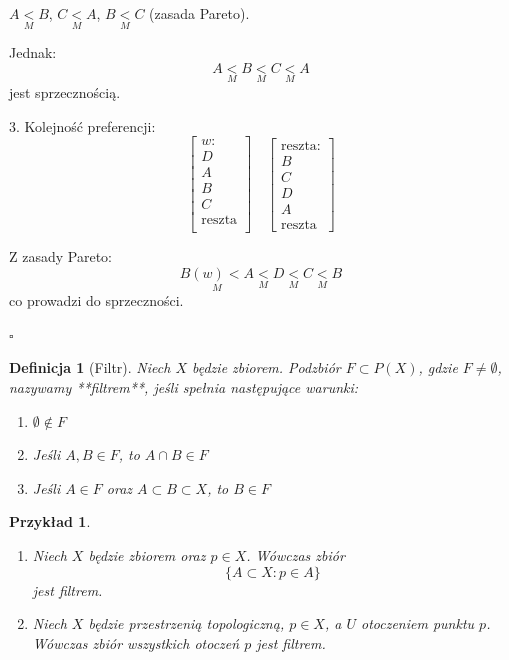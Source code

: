 \documentclass[12pt,a4paper]{article}
\theoremstyle{break}
\newtheorem{definition}{Definicja}[section]
\newtheorem{example}{Przykład}[section]
\begin{document}
	
	
	
	$A \underset{M}{<} B$, $C \underset{M}{<} A$, $B \underset{M}{<} C$ (zasada Pareto).  
	
	Jednak:
	\[
	A \underset{M}{<} B \underset{M}{<} C \underset{M}{<} A
	\]
	jest sprzecznością.
	
	3. Kolejność preferencji:
	\[
	\begin{bmatrix}
		w:\\
		D\\
		A\\
		B\\
		C\\
		\text{reszta}\\
	\end{bmatrix}
	\quad
	\begin{bmatrix}
		\text{reszta:}\\
		B\\
		C\\
		D\\
		A\\
		\text{reszta}
	\end{bmatrix}
	\]
	
	Z zasady Pareto:
	\[
	B \underset{M}{(w)<} A \underset{M}{<} D \underset{M}{<} C \underset{M}{<} B
	\]
	co prowadzi do sprzeczności.		
	\begin{flushright}$\square$\end{flushright}
			\begin{definition}[Filtr]
				Niech $X$ będzie zbiorem. Podzbiór $F \subset P(X)$, gdzie $F \neq \emptyset$, nazywamy **filtrem**, jeśli spełnia następujące warunki:
				\begin{enumerate}[1)]
					\item $\emptyset \notin F$
					\item Jeśli $A, B \in F$, to $A \cap B \in F$
					\item Jeśli $A \in F$ oraz $A \subset B \subset X$, to $B \in F$
				\end{enumerate}
			\end{definition}
			
			\begin{example}
				\begin{enumerate}[1.]
					\item Niech $X$ będzie zbiorem oraz $p \in X$. Wówczas zbiór
					\[
					\{A \subset X : p \in A \}
					\]
					jest filtrem.
					\item Niech $X$ będzie przestrzenią topologiczną, $p \in X$, a $U$ otoczeniem punktu $p$. Wówczas zbiór wszystkich otoczeń $p$ jest filtrem.
				\end{enumerate}
			\end{example}
			
\end{document}
